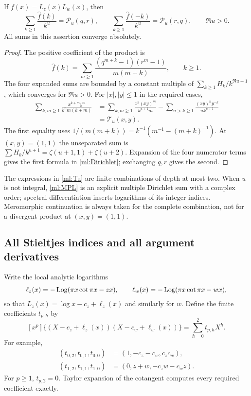 \begin{lemma}
\label{ml:coefficient}
If $f(x)=L_z(x)L_w(x)$, then
\begin{equation}\label{ml:Dirichlet}
 \sum_{k\ge1}\frac{\widehat f(k)}{k^u}=\mathcal P_u(q,r),\qquad
 \sum_{k\ge1}\frac{\widehat f(-k)}{k^u}=\mathcal P_u(r,q),
                          \qquad\Re u>0.
\end{equation}
All sums in this assertion converge absolutely.
\end{lemma}

\begin{proof}
The positive coefficient of the product is
\[
 \widehat f(k)=\sum_{m\ge1}
          \frac{(q^{m+k}-1)(r^m-1)}{m(m+k)},\qquad k\ge1.
\]
The four expanded sums are bounded by a constant multiple of
$\sum_{k\ge1}H_k/k^{\Re u+1}$, which converges for $\Re u>0$.
For $|x|,|y|\le1$ in the required cases,
\begin{align*}
 \sum_{k,m\ge1}\frac{x^{k+m}y^m}{k^um(k+m)}
 &=\sum_{k,m\ge1}\frac{x^k(xy)^m}{k^{u+1}m}
       -\sum_{n>k\ge1}\frac{(xy)^ny^{-k}}{nk^{u+1}}\\
 &=\mathcal T_u(x,y).
\end{align*}
The first equality uses
$1/(m(m+k))=k^{-1}(m^{-1}-(m+k)^{-1})$.
At $(x,y)=(1,1)$ the unseparated sum is
$\sum H_k/k^{u+1}=\zeta(u+1,1)+\zeta(u+2)$.
Expansion of the four numerator terms gives the first formula in
\eqref{ml:Dirichlet}; exchanging $q,r$ gives the second.
\end{proof}

The expressions in \eqref{ml:Tu} are finite combinations of depth at
most two. When $u$ is not integral, \eqref{ml:MPL} is an explicit
multiple Dirichlet sum with a complex order; spectral differentiation
inserts logarithms of its integer indices. Meromorphic continuation is
always taken for the complete combination, not for a divergent product
at $(x,y)=(1,1)$.

\subsection{All Stieltjes indices and all argument derivatives}

Write the local analytic logarithms
\[
 \ell_z(x)=-\operatorname{Log}(\pi x\cot\pi x-zx),\qquad
 \ell_w(x)=-\operatorname{Log}(\pi x\cot\pi x-wx),
\]
so that $L_z(x)=\log x-c_z+\ell_z(x)$ and similarly for $w$.
Define the finite coefficients $t_{p,h}$ by
\begin{equation}\label{ml:localt}
 [x^p]\{(X-c_z+\ell_z(x))(X-c_w+\ell_w(x))\}
                            =\sum_{h=0}^2t_{p,h}X^h.
\end{equation}
For example,
\begin{align*}
 (t_{0,2},t_{0,1},t_{0,0})&=(1,-c_z-c_w,c_zc_w),\\
 (t_{1,2},t_{1,1},t_{1,0})&=(0,z+w,-c_zw-c_wz).
\end{align*}
For $p\ge1$, $t_{p,2}=0$. Taylor expansion of the cotangent computes
every required coefficient exactly.

